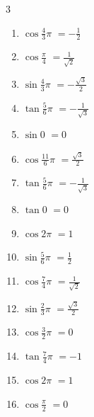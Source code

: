 \begin{multicols}{3}
\begin{enumerate}
  \itemsep=2pt
  \item $\displaystyle \cos{\frac{4}{3}\pi}$
        $\displaystyle =-\frac{1}{2}$

  \item $\displaystyle \cos{\frac{\pi}{4}}$
        $\displaystyle =\frac{1}{\sqrt{2}}$

  \item $\displaystyle \sin{\frac{4}{3}\pi}$
        $\displaystyle =-\frac{\sqrt{3}}{2}$

  \item $\displaystyle \tan{\frac{5}{6}\pi}$
        $\displaystyle =-\frac{1}{\sqrt{3}}$

  \item $\displaystyle \sin{0}$
        $\displaystyle =0$

  \item $\displaystyle \cos{\frac{11}{6}\pi}$
        $\displaystyle =\frac{\sqrt{3}}{2}$

  \item $\displaystyle \tan{\frac{5}{6}\pi}$
        $\displaystyle =-\frac{1}{\sqrt{3}}$

  \item $\displaystyle \tan{0}$
        $\displaystyle =0$

  \item $\displaystyle \cos{2\pi}$
        $\displaystyle =1$

  \item $\displaystyle \sin{\frac{5}{6}\pi}$
        $\displaystyle =\frac{1}{2}$

  \item $\displaystyle \cos{\frac{7}{4}\pi}$
        $\displaystyle =\frac{1}{\sqrt{2}}$

  \item $\displaystyle \sin{\frac{2}{3}\pi}$
        $\displaystyle =\frac{\sqrt{3}}{2}$

  \item $\displaystyle \cos{\frac{3}{2}\pi}$
        $\displaystyle =0$

  \item $\displaystyle \tan{\frac{7}{4}\pi}$
        $\displaystyle =-1$

  \item $\displaystyle \cos{2\pi}$
        $\displaystyle =1$

  \item $\displaystyle \cos{\frac{\pi}{2}}$
        $\displaystyle =0$


\end{enumerate}
\end{multicols}
